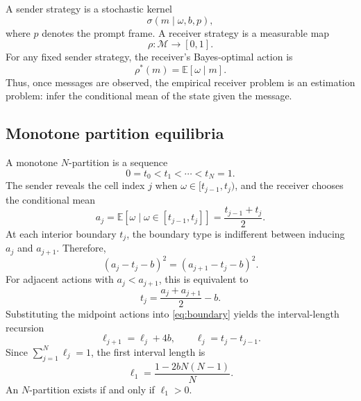 \documentclass[11pt]{article}
\newcommand{\E}{\mathbb{E}}
\newcommand{\calM}{\mathcal{M}}
\begin{document}
A sender strategy is a stochastic kernel
\begin{equation}
    \sigma(m\mid \omega,b,p),
\end{equation}
where $p$ denotes the prompt frame.  A receiver strategy is a measurable map
\begin{equation}
    \rho:\calM\to[0,1].
\end{equation}
For any fixed sender strategy, the receiver's Bayes-optimal action is
\begin{equation}
    \rho^*(m)=\E[\omega\mid m].
\end{equation}
Thus, once messages are observed, the empirical receiver problem is an estimation problem: infer the conditional mean of the state given the message.

\subsection{Monotone partition equilibria}

A monotone $N$-partition is a sequence
\begin{equation}
    0=t_0<t_1<\cdots<t_N=1.
\end{equation}
The sender reveals the cell index $j$ when $\omega\in[t_{j-1},t_j)$, and the receiver chooses the conditional mean
\begin{equation}
    a_j=\E[\omega\mid \omega\in[t_{j-1},t_j]]=\frac{t_{j-1}+t_j}{2}.
\end{equation}
At each interior boundary $t_j$, the boundary type is indifferent between inducing $a_j$ and $a_{j+1}$.  Therefore,
\begin{equation}
    (a_j-t_j-b)^2=(a_{j+1}-t_j-b)^2.
\end{equation}
For adjacent actions with $a_j<a_{j+1}$, this is equivalent to
\begin{equation}\label{eq:boundary}
    t_j=\frac{a_j+a_{j+1}}{2}-b.
\end{equation}
Substituting the midpoint actions into \eqref{eq:boundary} yields the interval-length recursion
\begin{equation}\label{eq:length-recursion}
    \ell_{j+1}=\ell_j+4b,\qquad \ell_j=t_j-t_{j-1}.
\end{equation}
Since $\sum_{j=1}^N\ell_j=1$, the first interval length is
\begin{equation}\label{eq:first-length}
    \ell_1=\frac{1-2bN(N-1)}{N}.
\end{equation}
An $N$-partition exists if and only if $\ell_1>0$.
\end{document}
